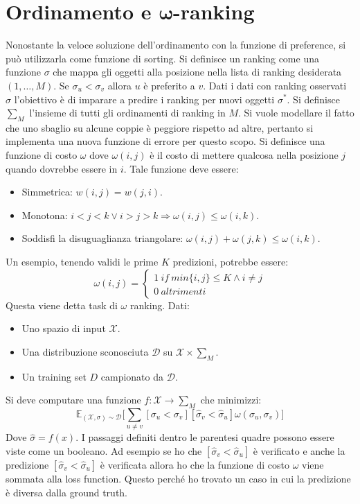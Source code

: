 \section{Ordinamento e $\mathbf{\omega}$-ranking}
Nonostante la veloce soluzione dell'ordinamento con la funzione di preference, si pu\`o utilizzarla come funzione di sorting.
Si definisce un ranking come una funzione $\sigma$ che mappa gli oggetti alla posizione nella lista di ranking desiderata $(1,\dots,M)$.
Se $\sigma_u < \sigma_v$ allora $u$ \`e preferito a $v$.
Dati i dati con ranking osservati $\sigma$ l'obiettivo \`e di imparare a predire i ranking per nuovi oggetti $\sigma^*$.
Si definisce $\sum_M$ l'insieme di tutti gli ordinamenti di ranking in $M$.
Si vuole modellare il fatto che uno sbaglio su alcune coppie \`e peggiore rispetto ad altre, pertanto si implementa una nuova funzione di errore per questo scopo.
Si definisce una funzione di costo $\omega$ dove $\omega(i,j)$ \`e il costo di mettere qualcosa nella posizione $j$ quando dovrebbe essere in $i$.
Tale funzione deve essere:
\begin{multicols}{2}
	\begin{itemize}
		\item Simmetrica: $w(i,j) = w(j,i)$.
		\item Monotona: $i<j<k\lor i>j>k \Rightarrow \omega(i,j) \le \omega(i,k)$.
		\item Soddisfi la disuguaglianza triangolare: $\omega(i,j)+\omega(j,k) \le \omega(i,k)$.
	\end{itemize}
\end{multicols}
Un esempio, tenendo validi le prime $K$ predizioni, potrebbe essere:
$$\omega(i,j) = \begin{cases}1\ if\ min\{i,j\} \le K \land i\neq j\\ 0\ altrimenti\end{cases}$$
Questa viene detta task di $\omega$ ranking.
Dati:
\begin{itemize}
	\item Uno spazio di input $\mathcal{X}$.
	\item Una distribuzione sconosciuta $\mathcal{D}$ su $\mathcal{X}\times\sum_M$.
	\item Un training set $D$ campionato da $\mathcal{D}$.
\end{itemize}
Si deve computare una funzione $f:\mathcal{X}\rightarrow\sum_M$ che minimizzi:
$$\mathbb{E}_{(\mathcal{X},\sigma)\sim\mathcal{D}}\biggl[\sum\limits_{u\neq v}[\sigma_u < \sigma_v][\hat{\sigma}_v < \hat{\sigma}_u]\omega(\sigma_u,\sigma_v)\biggr]$$
Dove $\hat{\sigma} = f(x)$. I passaggi definiti dentro le parentesi quadre possono essere viste come un booleano. Ad esempio se ho che $[\hat{\sigma}_v < \hat{\sigma}_u]$
è verificato e anche la predizione $[\hat{\sigma}_v < \hat{\sigma}_u]$ è verificata allora ho che la funzione di costo $\omega$ viene sommata alla loss function. 
Questo perché ho trovato un caso in cui la predizione è diversa dalla ground truth.

